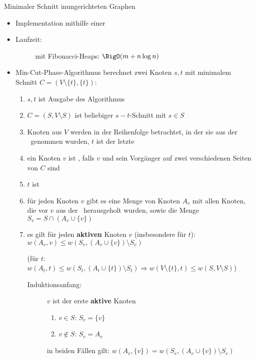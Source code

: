 \begin{TOPbreak}{Minimaler Schnitt in}{ungerichteten Graphen}
\begin{itemize}
\begin{description}
\begin{itemize}
					\item Implementation mithilfe einer \PQ
					\item \begin{description}
							\item [Laufzeit:] mit Fibonacci-Heaps: $\BigO(m+n\log n)$
						\end{description}
				\end{itemize}
		\end{description}
	\end{itemize}
	\topbreak
	\up\up
	\begin{itemize}
		\item Min-Cut-Phase-Algorithmus berechnet zwei Knoten $s,t$ mit minimalem Schnitt $C=(V\setminus \{t\},\{t\})$:\up
		\Proof\vspace*{-0.5\baselineskip}
		\newcounter{temp}
		\begin{enumerate}
			\item $s,t$ ist Ausgabe des Algorithmus
			\item $C=(S,V\setminus S)$ ist beliebiger $s-t$-Schnitt mit $s\in S$
			\item Knoten aus $V$ werden in der Reihenfolge betrachtet, in der sie aus der \PQ~genommen wurden, $t$ ist der letzte
			\item ein Knoten $v$ ist \aktiv, falls $v$ und sein Vorgänger auf zwei verschiedenen Seiten von $C$ sind
			\item $t$ ist \aktiv
			\item für jeden Knoten $v$ gibt es eine Menge von Knoten $A_v$ mit allen Knoten, die vor $v$ aus der \PQ~herausgeholt wurden, sowie die Menge $S_v = S\cap (A_v \cup \{v\})$
			\item es gilt für jeden \textbf{aktiven} Knoten $v$ (insbesondere für $t$): $w(A_v,v)\leq w(S_v, (A_v \cup \{v\})\setminus S_v)$ \par(für $t$: $w(A_t,t)\leq w(S_t, (A_t \cup \{t\})\setminus S_t) \Rightarrow w(V\setminus\{t\},t) \leq w(S, V\setminus S)$)
				\up\Proof\vspace*{-0.5\baselineskip}
				\begin{description}
					\item[Induktionsanfang:] $v$ ist der erste \textbf{aktive} Knoten
						\begin{enumerate}
							\item $v\in S$: $S_v = \{v\}$
							\item $v\notin S$: $S_v=A_v$
						\end{enumerate}
						in beiden Fällen gilt: $w(A_v,\{v\}) = w(S_v,(A_v \cup \{v\})\setminus S_v)$

\end{description}
\end{enumerate}
\end{itemize}
\end{TOPbreak}
